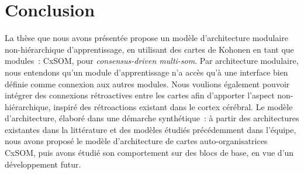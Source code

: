 \chapter*{Conclusion}




La thèse que nous avons présentée propose un modèle d'architecture modulaire non-hiérarchique d'apprentissage, en utilisant des cartes de Kohonen en tant que modules~: CxSOM, pour \emph{consensus-driven multi-som}.
Par architecture modulaire, nous entendons qu'un module d'apprentissage n'a accès qu'à une interface bien définie comme connexion aux autres modules. Nous voulions également pouvoir intégrer des connexions rétroactives entre les cartes afin d'apporter l'aspect non-hiérarchique, inspiré des rétroactions existant dans le cortex cérébral.
Le modèle d'architecture, élaboré dans une démarche synthétique~: à partir des architectures existantes dans la littérature et des modèles étudiés précédemment dans l'équipe, nous avons proposé le modèle d'architecture de cartes auto-organisatrices CxSOM, puis avons étudié son comportement sur des blocs de base, en vue d'un développement futur.

